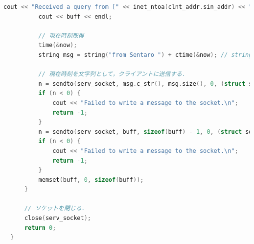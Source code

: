 \documentclass[fleqn, a4paper. 12pt]{ltjsarticle}
\begin{document}
\begin{lstlisting}[language=C++]
          cout << "Received a query from [" << inet_ntoa(clnt_addr.sin_addr) << ", " << htons(clnt_addr.sin_port) << "]" << endl;
          cout << buff << endl;
          
          // 現在時刻取得
          time(&now);
          string msg = string("from Sentaro ") + ctime(&now); // string クラスは加算演算子で文字列を結合可能．
  
          // 現在時刻を文字列として，クライアントに送信する．
          n = sendto(serv_socket, msg.c_str(), msg.size(), 0, (struct sockaddr*)&clnt_addr, sizeof(clnt_addr));
          if (n < 0) {
              cout << "Failed to write a message to the socket.\n";
              return -1;
          }
          n = sendto(serv_socket, buff, sizeof(buff) - 1, 0, (struct sockaddr*)&clnt_addr, sizeof(clnt_addr));
          if (n < 0) {
              cout << "Failed to write a message to the socket.\n";
              return -1;
          }
          memset(buff, 0, sizeof(buff));
      }
  
      // ソケットを閉じる．
      close(serv_socket);
      return 0;
  }
  
\end{lstlisting}
\end{document}
